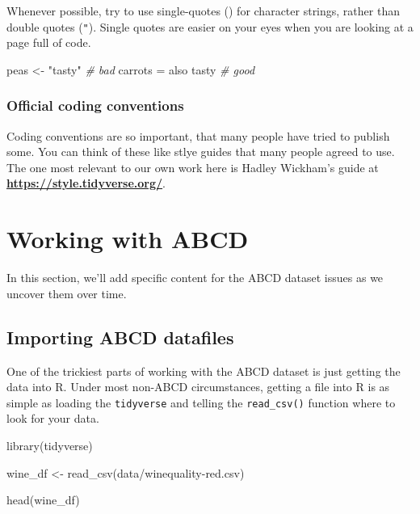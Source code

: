 \documentclass[
]{book}
\newenvironment{Shaded}{\begin{snugshade}}{\end{snugshade}}
\newcommand{\CommentTok}[1]{\textcolor[rgb]{0.56,0.35,0.01}{\textit{#1}}}
\newcommand{\FunctionTok}[1]{\textcolor[rgb]{0.00,0.00,0.00}{#1}}
\newcommand{\NormalTok}[1]{#1}
\newcommand{\OtherTok}[1]{\textcolor[rgb]{0.56,0.35,0.01}{#1}}
\newcommand{\StringTok}[1]{\textcolor[rgb]{0.31,0.60,0.02}{#1}}
\begin{document}
Whenever possible, try to use single-quotes (\texttt{\textquotesingle{}}) for character strings, rather than double quotes (\texttt{"}). Single quotes are easier on your eyes when you are looking at a page full of code.

\begin{Shaded}
\begin{Highlighting}[]
\NormalTok{peas }\OtherTok{\textless{}{-}} \StringTok{"tasty"} \CommentTok{\# bad}
\NormalTok{carrots }\OtherTok{=} \StringTok{\textquotesingle{}also tasty\textquotesingle{}} \CommentTok{\# good}
\end{Highlighting}
\end{Shaded}

\hypertarget{official-coding-conventions}{%
\subsection{Official coding conventions}\label{official-coding-conventions}}

Coding conventions are so important, that many people have tried to publish some. You can think of these like stlye guides that many people agreed to use. The one most relevant to our own work here is Hadley Wickham's guide at \href{https://style.tidyverse.org/}{\textbf{https://style.tidyverse.org/}}.

\hypertarget{working-with-abcd}{%
\chapter{Working with ABCD}\label{working-with-abcd}}

In this section, we'll add specific content for the ABCD dataset issues as we uncover them over time.

\hypertarget{importing-abcd-datafiles}{%
\section{Importing ABCD datafiles}\label{importing-abcd-datafiles}}

One of the trickiest parts of working with the ABCD dataset is just getting the data into R. Under most non-ABCD circumstances, getting a file into R is as simple as loading the \texttt{tidyverse} and telling the \texttt{read\_csv()} function where to look for your data.

\begin{Shaded}
\begin{Highlighting}[]
\FunctionTok{library}\NormalTok{(tidyverse)}

\NormalTok{wine\_df }\OtherTok{\textless{}{-}} \FunctionTok{read\_csv}\NormalTok{(}\StringTok{\textquotesingle{}data/winequality{-}red.csv\textquotesingle{}}\NormalTok{)}

\FunctionTok{head}\NormalTok{(wine\_df)}
\end{Highlighting}
\end{Shaded}
\end{document}

